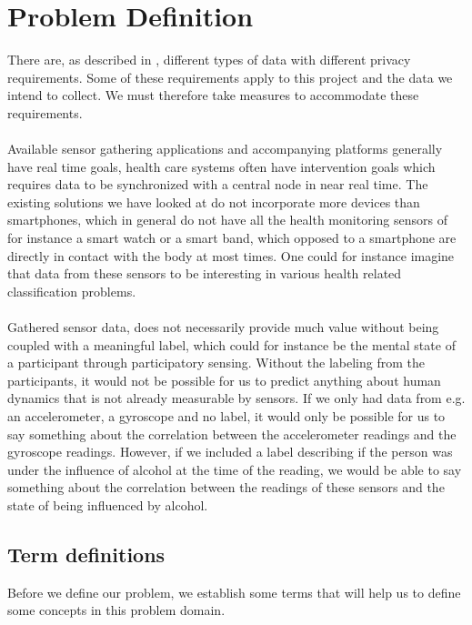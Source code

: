 
\section{Problem Definition} 
\label{sec:problem_definition}
There are, as described in , different types of data with different privacy requirements. Some of these requirements apply to this project and the data we intend to collect. We must therefore take measures to accommodate these requirements.
\\\\
Available sensor gathering applications and accompanying platforms generally have real time goals, health care systems often have intervention goals which requires data to be synchronized with a central node in near real time. The existing solutions we have looked at do not incorporate more devices than smartphones, which in general do not have all the health monitoring sensors of for instance a smart watch or a smart band, which opposed to a smartphone are directly in contact with the body at most times. One could for instance imagine that data from these sensors to be interesting in various health related classification problems. 
\\\\
Gathered sensor data, does not necessarily provide much value without being coupled with a meaningful label, which could for instance be the mental state of a participant through participatory sensing. Without the labeling from the participants, it would not be possible for us to predict anything about human dynamics that is not already measurable by sensors. If we only had data from e.g. an accelerometer, a gyroscope and no label, it would only be possible for us to say something about the correlation between the accelerometer readings and the gyroscope readings. However, if we included a label describing if the person was under the influence of alcohol at the time of the reading, we would be able to say something about the correlation between the readings of these sensors and the state of being influenced by alcohol. 

\subsection{Term definitions}
Before we define our problem, we establish some terms that will help us to define some concepts in this problem domain. 


